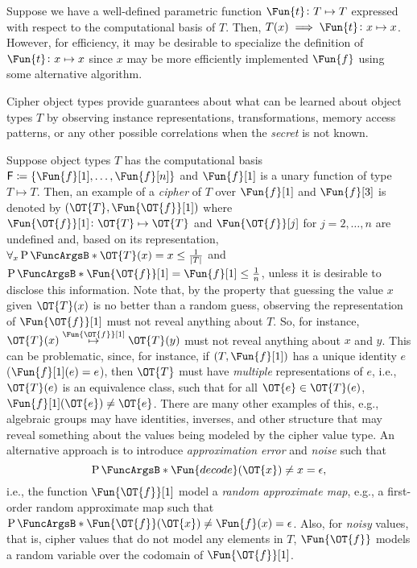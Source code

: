 \documentclass[ ../main.tex]{subfiles}
\begin{document}
Suppose we have a well-defined parametric function $\Fun{t} \colon T \mapsto T$ expressed with respect to the computational basis of $T$.
Then, $T(x) \implies \Fun{t} \colon x \mapsto x$.
However, for efficiency, it may be desirable to specialize the definition of $\Fun{t} \colon x \mapsto x$ since $x$ may be more efficiently implemented $\Fun{f}$ using some alternative algorithm.

Cipher object types\cite{obtype} provide guarantees about what can be learned about object types $T$ by observing instance representations, transformations, memory access patterns, or any other possible correlations when the \emph{secret} is not known.

Suppose object types $T$ has the computational basis $\Set{F} \coloneqq \{\Fun{f}[1],\ldots,\Fun{f}[n]\}$ and $\Fun{f}[1]$ is a unary function of type $T \mapsto T$.
Then, an example of a \emph{cipher} of $T$ over $\Fun{f}[1]$ and $\Fun{f}[3]$ is denoted by $(\OT{T},\Fun{\OT{f}}[1])$ where $\Fun{\OT{f}}[1] \colon \OT{T} \mapsto \OT{T}$ and $\Fun{\OT{f}}[j]$ for $j=2,
\ldots,n$ are undefined and, based on its representation, $\forall_{x} \Prob{\OT{T}(x) = x} \leq \frac{1}{\Card{T}}$ and $\Prob{\Fun{\OT{f}}[1] = \Fun{f}[1]} \leq \frac{1}{n}$, unless it is desirable to disclose this information.
Note that, by the property that guessing the value $x$ given $\OT{T}(x)$ is no better than a random guess, observing the representation of $\Fun{\OT{f}}[1]$ must not reveal anything about $T$.
So, for instance, $\OT{T}(x) \overset{\Fun{\OT{f}}[1]}{\mapsto} \OT{T}(y)$ must not reveal anything about $x$ and $y$.
This can be problematic, since, for instance, if $(T,\Fun{f}[1])$ has a unique identity $e$ ($\Fun{f}[1](e) = e$), then $\OT{T}$ must have \emph{multiple} representations of $e$, i.e., $\OT{T}(e)$ is an equivalence class, such that for all $\OT{e} \in \OT{T}(e)$, $\Fun{f}[1](\OT{e}) \neq \OT{e}$.
There are many other examples of this, e.g., algebraic groups may have identities, inverses, and other structure that may reveal something about the values being modeled by the cipher value type.
An alternative approach is to introduce \emph{approximation error} and \emph{noise} such that
\begin{equation}
    \Prob{\Fun{decode}(\OT{x}) \neq x} = \epsilon,
\end{equation}
i.e., the function $\Fun{\OT{f}}[1]$ model a \emph{random approximate map}, e.g., a first-order random approximate map such that $\Prob{\Fun{\OT{f}}(\OT{x}) \neq \Fun{f}(x)} = \epsilon$.
Also, for \emph{noisy} values, that is, cipher values that do not model any elements in $T$, $\Fun{\OT{f}}$ models a random variable over the codomain of $\Fun{\OT{f}}[1]$.
\end{document}
